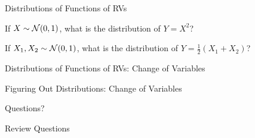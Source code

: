 \documentclass[handout,fleqn,aspectratio=169]{beamer}
\begin{document}
\begin{frame}{Distributions of Functions of RVs}

\plitemsep 0.1in

\bci 

\item If $X \sim {\cal N}(0,1)$, what is the distribution of $Y = X^2$?

\item If $X_1, X_2 \sim {\cal N}(0,1)$, what is the distribution of $Y = \frac{1}{2}(X_1 + X_2)$?
\eci
\end{frame}

\begin{frame}{Distributions of Functions of RVs: Change of Variables}

\plitemsep 0.1in

\bci 

\item 

\eci
\end{frame}

\begin{frame}{Figuring Out Distributions: Change of Variables}

\plitemsep 0.1in

\bci 

\item 

\eci
\end{frame}



\begin{frame}{}
\vspace{2cm}
\LARGE Questions?


\end{frame}

\begin{frame}{Review Questions}
\bce[1)]
\item 

\ece
\end{frame}
\end{document}

